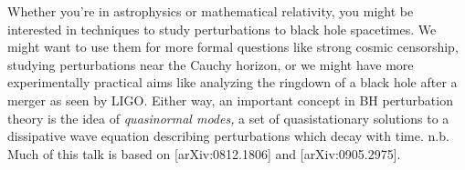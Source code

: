 \documentclass{tufte-handout}
\newcommand{\?}{\overset{?}{=}}
\newcommand{\term}{\emph}
\theoremstyle{definition}
\theoremstyle{remark}
\begin{document}



Whether you're in astrophysics or mathematical relativity, you might be interested in techniques to study perturbations to black hole spacetimes. We might want to use them for more formal questions like strong cosmic censorship, studying perturbations near the Cauchy horizon, or we might have more experimentally practical aims like analyzing the ringdown of a black hole after a merger as seen by LIGO. Either way, an important concept in BH perturbation theory is the idea of \term{quasinormal modes,} a set of quasistationary solutions to a dissipative wave equation describing perturbations which decay with time. n.b. Much of this talk is based on [arXiv:0812.1806] and [arXiv:0905.2975].
\end{document}
